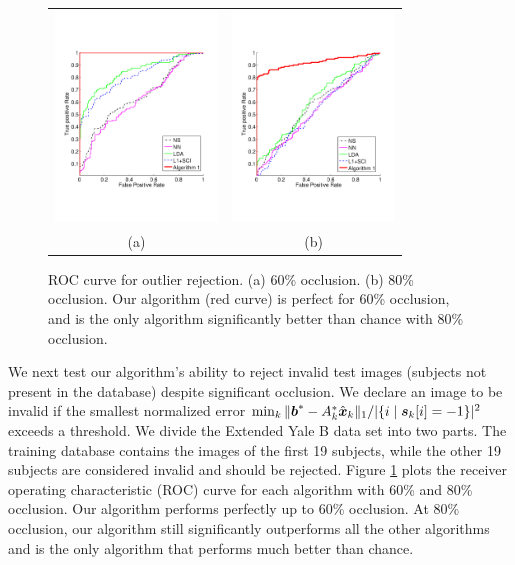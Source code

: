 \begin{figure}
\centering
\begin{tabular}{cc}
\includegraphics[height=2.2in]{figures_iccv/roc/eYB-60.pdf}&
\includegraphics[height=2.2in]{figures_iccv/roc/eYB-80.pdf}\\
(a) & (b)
\end{tabular}
\caption{ROC curve for outlier rejection. (a) 60\% occlusion. (b)
80\% occlusion. Our algorithm (red curve) is perfect for 60\% occlusion, and is the only algorithm significantly better than chance with 80\% occlusion.}\label{fig:yale-roc} \vspace{0mm}
\end{figure}

We next test our algorithm's ability to reject invalid test images
(subjects not present in the database) despite significant occlusion.
We declare an image to be invalid if the smallest normalized error
$\min_k \| \boldsymbol{b}^* - A_k^* \hat{{\boldsymbol{x}}}_k \|_1 / | \{ i \mid \boldsymbol{s}_k[i] = -1 \} |^2$ exceeds a threshold.
We divide the Extended Yale B data set into two parts.
The training database contains the images of the first 19 subjects, while the other 19 subjects
are considered invalid and should be rejected. Figure \ref{fig:yale-roc} plots
the receiver operating characteristic (ROC) curve for each algorithm
with 60\% and 80\% occlusion. Our algorithm performs perfectly up
to 60\% occlusion. At 80\% occlusion, our algorithm still
significantly outperforms all the other algorithms and is the only
algorithm that performs much better than chance.\vspace{0mm}

